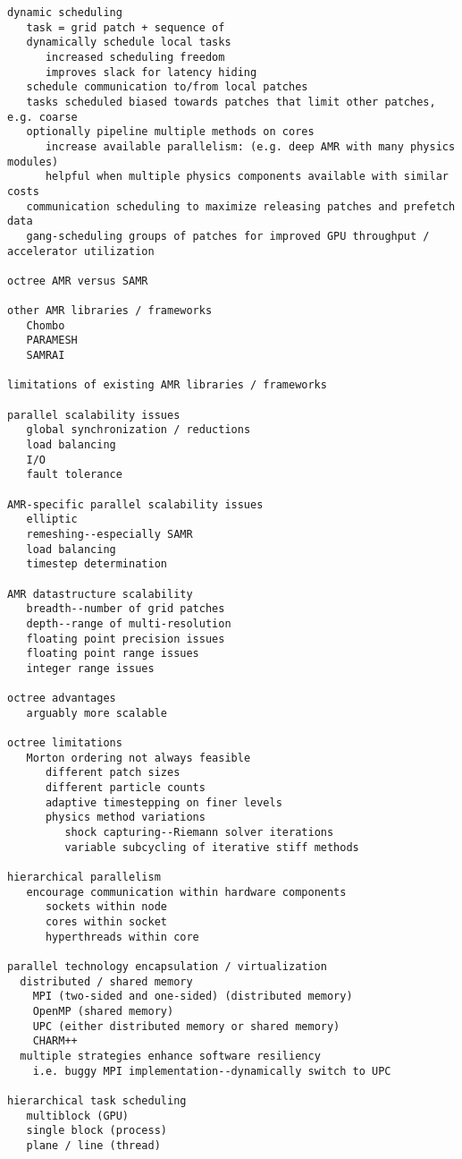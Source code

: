 \documentclass[14pt,letter]{article}
\begin{document}
\begin{verbatim}
dynamic scheduling
   task = grid patch + sequence of 
   dynamically schedule local tasks
      increased scheduling freedom
      improves slack for latency hiding
   schedule communication to/from local patches
   tasks scheduled biased towards patches that limit other patches, e.g. coarse
   optionally pipeline multiple methods on cores
      increase available parallelism: (e.g. deep AMR with many physics modules)
      helpful when multiple physics components available with similar costs
   communication scheduling to maximize releasing patches and prefetch data
   gang-scheduling groups of patches for improved GPU throughput / accelerator utilization

octree AMR versus SAMR   

other AMR libraries / frameworks
   Chombo
   PARAMESH
   SAMRAI

limitations of existing AMR libraries / frameworks

parallel scalability issues
   global synchronization / reductions
   load balancing
   I/O
   fault tolerance

AMR-specific parallel scalability issues
   elliptic
   remeshing--especially SAMR
   load balancing
   timestep determination

AMR datastructure scalability
   breadth--number of grid patches
   depth--range of multi-resolution
   floating point precision issues
   floating point range issues
   integer range issues

octree advantages
   arguably more scalable

octree limitations
   Morton ordering not always feasible
      different patch sizes
      different particle counts
      adaptive timestepping on finer levels
      physics method variations
         shock capturing--Riemann solver iterations
         variable subcycling of iterative stiff methods

hierarchical parallelism
   encourage communication within hardware components
      sockets within node
      cores within socket
      hyperthreads within core

parallel technology encapsulation / virtualization
  distributed / shared memory
    MPI (two-sided and one-sided) (distributed memory)
    OpenMP (shared memory) 
    UPC (either distributed memory or shared memory)
    CHARM++
  multiple strategies enhance software resiliency
    i.e. buggy MPI implementation--dynamically switch to UPC

hierarchical task scheduling
   multiblock (GPU)
   single block (process)
   plane / line (thread)


\end{verbatim}
\end{document}
